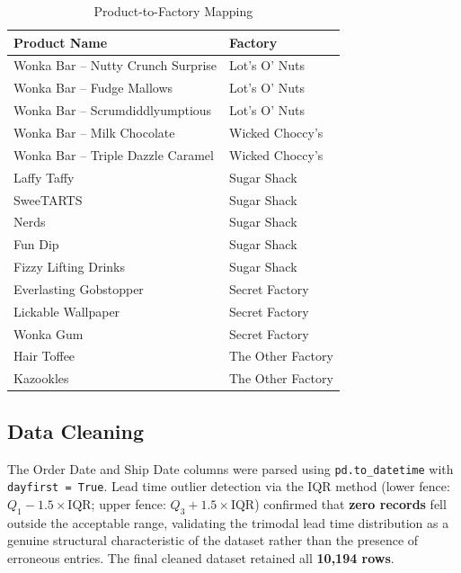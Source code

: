 \documentclass[12pt, a4paper]{article}
\begin{document}
\begin{table}[H]
\centering
\caption{Product-to-Factory Mapping}
\label{tab:factory_map}
\renewcommand{\arraystretch}{1.12}
\begin{tabular}{ll}
\toprule
\textbf{Product Name} & \textbf{Factory} \\
\midrule
Wonka Bar -- Nutty Crunch Surprise  & Lot's O' Nuts \\
Wonka Bar -- Fudge Mallows          & Lot's O' Nuts \\
Wonka Bar -- Scrumdiddlyumptious    & Lot's O' Nuts \\
Wonka Bar -- Milk Chocolate         & Wicked Choccy's \\
Wonka Bar -- Triple Dazzle Caramel  & Wicked Choccy's \\
Laffy Taffy                        & Sugar Shack \\
SweeTARTS                          & Sugar Shack \\
Nerds                              & Sugar Shack \\
Fun Dip                            & Sugar Shack \\
Fizzy Lifting Drinks               & Sugar Shack \\
Everlasting Gobstopper             & Secret Factory \\
Lickable Wallpaper                 & Secret Factory \\
Wonka Gum                          & Secret Factory \\
Hair Toffee                        & The Other Factory \\
Kazookles                          & The Other Factory \\
\bottomrule
\end{tabular}
\end{table}

\subsection{Data Cleaning}

The Order Date and Ship Date columns were parsed using \texttt{pd.to\_datetime}
with \texttt{dayfirst = True}. Lead time outlier detection via the IQR method
(lower fence: $Q_1 - 1.5 \times \text{IQR}$; upper fence:
$Q_3 + 1.5 \times \text{IQR}$) confirmed that \textbf{zero records} fell
outside the acceptable range, validating the trimodal lead time distribution
as a genuine structural characteristic of the dataset rather than the
presence of erroneous entries. The final cleaned dataset retained all
\textbf{10,194 rows}.
\end{document}
